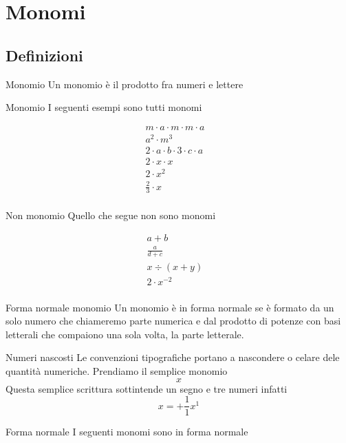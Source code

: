\chapter{Monomi}
\label{cha:monomi}
\section{Definizioni}
\begin{definizionet}{Monomio}{}
	Un monomio è il prodotto fra numeri e lettere
\end{definizionet}
\begin{esempiot}{Monomio}{}
I seguenti esempi sono tutti monomi
\end{esempiot}
\begin{align*}
	m\cdot a\cdot m\cdot m\cdot a&\\
	a^2\cdot m^3&\\
	2\cdot a\cdot b\cdot3\cdot c\cdot a&\\
	2\cdot x\cdot x&\\
		2\cdot x^2&\\
		\frac{2}{3}\cdot x&\\
\end{align*}
\begin{esempiot}{Non monomio}{}
Quello che segue  non sono monomi
\end{esempiot}
\begin{align*}
a+b&\\
\frac{a}{d+c}&\\
x\div(x+y)&\\
		2\cdot x^{-2}&\\
\end{align*}
\begin{definizionet}{Forma normale monomio}{}
Un monomio è  in forma normale se è formato da un solo numero che chiameremo parte numerica e dal prodotto di potenze con basi letterali che compaiono una sola volta, la parte letterale.
\end{definizionet}
\begin{osservazionet}{Numeri nascosti}{}
	Le convenzioni tipografiche portano a nascondere o celare dele quantità numeriche. Prendiamo il semplice monomio \[x\]Questa semplice scrittura sottintende un segno e tre numeri infatti
	\[x=+\dfrac{1}{1}x^1\] 
\end{osservazionet}
\begin{esempiot}{Forma normale}{}
	I seguenti monomi sono in forma normale
\end{esempiot}
